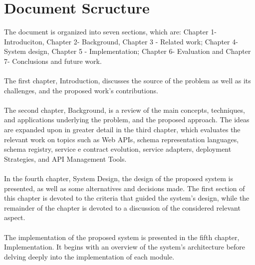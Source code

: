 \section{Document Scructure} %
\label{sec:document_structure}

The document is organized into seven sections, which are: Chapter 1-Introduciton, Chapter 2-
Background, Chapter 3 - Related work; Chapter 4-System design, Chapter 5 - Implementation;
Chapter 6- Evaluation and Chapter 7- Conclusions and future work.

\paragraph{}

The first chapter, Introduction, discusses the source of the problem as well as its challenges,
and the proposed work's contributions.

\paragraph{}

The second chapter, Background, is a review of the main concepts, techniques, and
applications underlying the problem, and the proposed approach.
The ideas are expanded upon in greater detail in the third chapter, which evaluates the relevant work on topics such as
Web APIs, schema representation languages, schema registry, service e contract evolution,
service adapters, deployment Strategies, and API Management Tools.

\paragraph{}

In the fourth chapter, System Design, the design of the proposed system is presented, as well
as some alternatives and decisions made.
The first section of this chapter is devoted to the
criteria that guided the system's design, while the remainder of the chapter is devoted to a
discussion of the considered relevant aspect.

\paragraph{}

The implementation of the proposed system is presented in the fifth chapter, Implementation.
It begins with an overview of the system's architecture before delving deeply into the implementation of each module.

